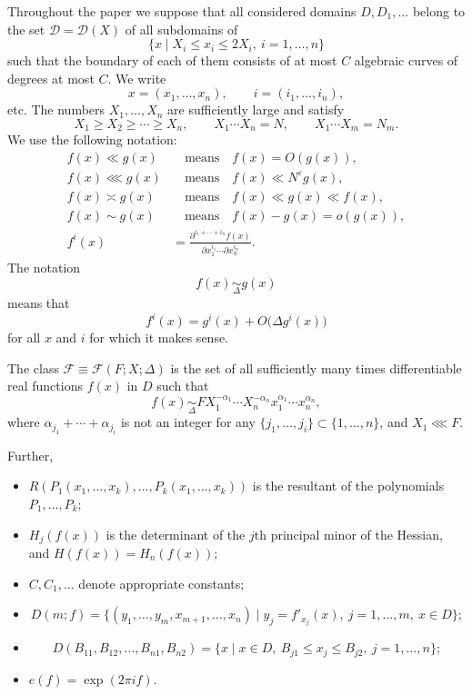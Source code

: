 \documentclass[10pt]{article}
\begin{document}
Throughout the paper we suppose that all considered domains $D,D_1,\ldots$ belong to the set $\mathscr D=\mathscr D(X)$ of all subdomains of
\[
  \{x\mid X_i\leqslant x_i\leqslant2X_i,\ i=1,\ldots,n\}
\]
such that the boundary of each of them consists of at most $C$ algebraic curves of degrees at most $C$. We write
\[
  x=(x_1,\ldots,x_n),\qquad i=(i_1,\ldots,i_n),
\]
etc. The numbers $X_1,\ldots,X_n$ are sufficiently large and satisfy
\[
  X_1\geqslant X_2\geqslant\cdots\geqslant X_n,
  \qquad X_1\cdots X_n=N,
  \qquad X_1\cdots X_m=N_m.
\]
We use the following notation:
\begin{align*}
  f(x)\ll g(x)
  &\quad\text{means}\quad f(x)=O(g(x)),\\
  f(x)\lll g(x)
  &\quad\text{means}\quad f(x)\ll N^\varepsilon g(x),\\
  f(x)\asymp g(x)
  &\quad\text{means}\quad f(x)\ll g(x)\ll f(x),\\
  f(x)\sim g(x)
  &\quad\text{means}\quad f(x)-g(x)=o(g(x)),\\
  f^i(x)
  &=\frac{\partial^{i_1+\cdots+i_n}f(x)}
          {\partial x_1^{i_1}\cdots\partial x_n^{i_n}}.
\end{align*}
The notation
\[
  f(x)\underset{\Delta}{\sim}g(x)
\]
means that
\[
  f^i(x)=g^i(x)+O\bigl(\Delta g^i(x)\bigr)
\]
for all $x$ and $i$ for which it makes sense.

The class $\mathscr F\equiv\mathscr F(F;X;\Delta)$ is the set of all sufficiently many times differentiable real functions $f(x)$ in $D$ such that
\[
  f(x)\underset{\Delta}{\sim}
  FX_1^{-\alpha_1}\cdots X_n^{-\alpha_n}x_1^{\alpha_1}\cdots x_n^{\alpha_n},
\]
where $\alpha_{j_1}+\cdots+\alpha_{j_i}$ is not an integer for any
$\{j_1,\ldots,j_i\}\subset\{1,\ldots,n\}$, and $X_1\lll F$.

Further,
\begin{itemize}
  \item $R(P_1(x_1,\ldots,x_k),\ldots,P_k(x_1,\ldots,x_k))$ is the resultant of the polynomials $P_1,\ldots,P_k$;
  \item $H_j(f(x))$ is the determinant of the $j$th principal minor of the Hessian, and $H(f(x))=H_n(f(x))$;
  \item $C,C_1,\ldots$ denote appropriate constants;
  \item
  \[
    D(m;f)=\{(y_1,\ldots,y_m,x_{m+1},\ldots,x_n)
      \mid y_j=f'_{x_j}(x),\ j=1,\ldots,m,\ x\in D\};
  \]
  \item
  \[
    D(B_{11},B_{12},\ldots,B_{n1},B_{n2})
    =\{x\mid x\in D,\ B_{j1}\leqslant x_j\leqslant B_{j2},\ j=1,\ldots,n\};
  \]
  \item $e(f)=\exp(2\pi i f)$.
\end{itemize}
\end{document}
